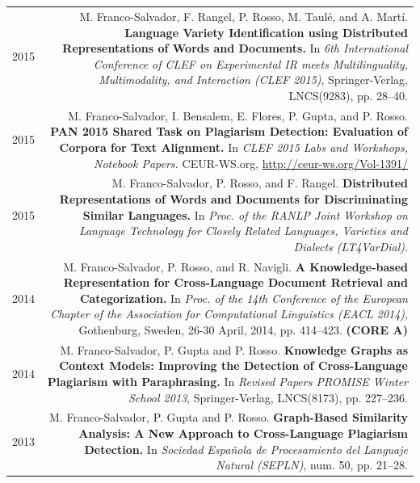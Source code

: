 \documentclass[10pt]{article}
\begin{document}
\section*{}
\begin{tabular}{L!{\VRule}R}
	2015&M. Franco-Salvador, F. Rangel, P. Rosso, M. Taul{\'e}, and A. Mart{\'i}. \textbf{Language Variety Identification using Distributed Representations of Words and Documents.}
	In \emph{6th International Conference of CLEF on Experimental IR meets Multilinguality, Multimodality, and Interaction (CLEF 2015)}, Springer-Verlag, LNCS(9283), pp. 28--40. \vspace{5pt}\\
	2015&M. Franco-Salvador, I. Bensalem, E. Flores, P. Gupta, and P. Rosso. \textbf{PAN 2015 Shared Task on Plagiarism Detection: Evaluation of Corpora for Text Alignment.}
	In \emph{CLEF 2015 Labs and Workshops, Notebook Papers.} CEUR-WS.org, \href{http://ceur-ws.org/Vol-1391/}{http://ceur-ws.org/Vol-1391/} \vspace{5pt}\\
	2015&M. Franco-Salvador, P. Rosso, and F. Rangel. \textbf{Distributed Representations of Words and Documents for Discriminating Similar Languages.}
	In \emph{Proc. of the RANLP Joint Workshop on Language Technology for Closely Related Languages, Varieties and Dialects (LT4VarDial)}. \vspace{5pt}\\
	2014&M. Franco-Salvador, P. Rosso, and R. Navigli. \textbf{A Knowledge-based Representation for Cross-Language Document Retrieval and Categorization.}
	In \emph{Proc. of the 14th Conference of the European Chapter of the Association for Computational Linguistics (EACL 2014)}, Gothenburg, Sweden, 26-30 April, 2014, pp. 414--423. \textbf{(CORE A)} \vspace{5pt}\\
	2014&M. Franco-Salvador, P. Gupta and P. Rosso. \textbf{Knowledge Graphs as Context Models: Improving the Detection of Cross-Language Plagiarism with Paraphrasing.}
	In \emph{Revised Papers PROMISE Winter School 2013}, Springer-Verlag, LNCS(8173), pp. 227--236.\vspace{5pt}\\
	2013&M. Franco-Salvador, P. Gupta and P. Rosso. \textbf{Graph-Based Similarity Analysis: A New Approach to Cross-Language Plagiarism Detection.}
	In \emph{Sociedad Espa{\~n}ola de Procesamiento del Languaje Natural (SEPLN)}, num. 50, pp. 21--28. \vspace{5pt}\\

\end{tabular}
\end{document}
